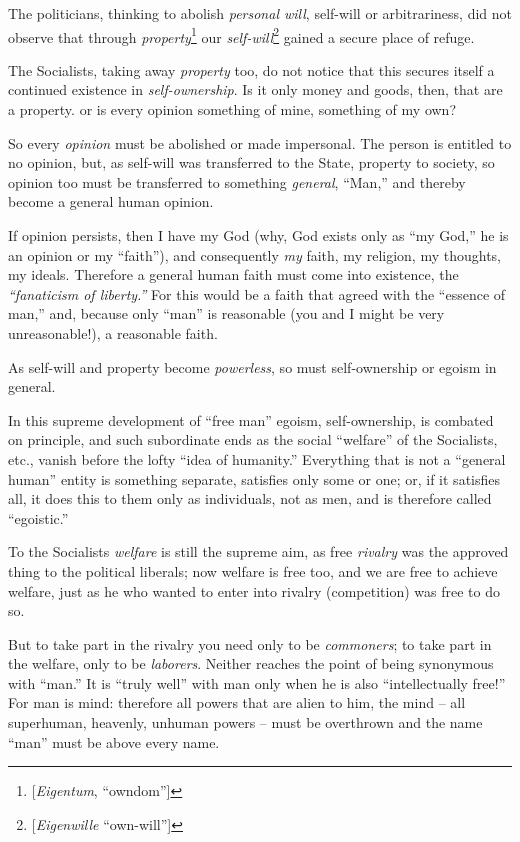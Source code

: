 \documentclass[12pt,a4paper]{book}
\begin{document}
The politicians, thinking to abolish \textit{personal will}, self-will or 
arbitrariness, did not observe that through 
\textit{property}\footnote{[\textit{Eigentum}, ``owndom'']} our 
\textit{self-will}\footnote{[\textit{Eigenwille} ``own-will'']} gained a 
secure place of refuge.

The Socialists, taking away \textit{property} too, do not notice that this 
secures itself a continued existence in \textit{self-ownership}. Is it only 
money and goods, then, that are a property. or is every opinion something of 
mine, something of my own?

So every \textit{opinion} must be abolished or made impersonal. The person is 
entitled to no opinion, but, as self-will was transferred to the State, 
property to society, so opinion too must be transferred to something 
\textit{general}, ``Man,'' and thereby become a general human opinion.

If opinion persists, then I have my God (why, God exists only as ``my God,'' 
he is an opinion or my ``faith''), and consequently \textit{my} faith, my 
religion, my thoughts, my ideals. Therefore a general human faith must come 
into existence, the \textit{``fanaticism of liberty.''} For this would be a 
faith that agreed with the ``essence of man,'' and, because only ``man'' 
is reasonable (you and I might be very unreasonable!), a reasonable faith.

As self-will and property become \textit{powerless}, so must self-ownership or 
egoism in general.

In this supreme development of ``free man'' egoism, self-ownership, is 
combated on principle, and such subordinate ends as the social ``welfare'' 
of the Socialists, etc., vanish before the lofty ``idea of humanity.'' 
Everything that is not a ``general human'' entity is something separate, 
satisfies only some or one; or, if it satisfies all, it does this to them only 
as individuals, not as men, and is therefore called ``egoistic.''

To the Socialists \textit{welfare} is still the supreme aim, as free 
\textit{rivalry} was the approved thing to the political liberals; now welfare 
is free too, and we are free to achieve welfare, just as he who wanted to 
enter into rivalry (competition) was free to do so.

But to take part in the rivalry you need only to be \textit{commoners}; to 
take part in the welfare, only to be \textit{laborers}. Neither reaches the 
point of being synonymous with ``man.'' It is ``truly well'' with man only 
when he is also ``intellectually free!'' For man is mind: therefore all 
powers that are alien to him, the mind -- all superhuman, heavenly, unhuman 
powers -- must be overthrown and the name ``man'' must be above every name.
\end{document}
